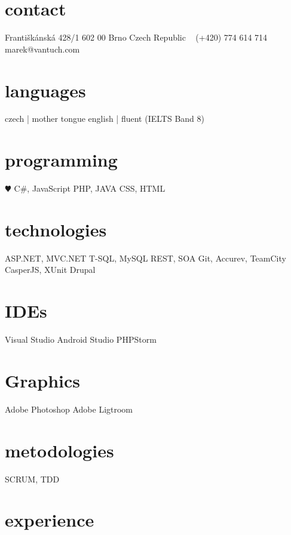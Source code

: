 \documentclass[]{friggeri-cv} %
\begin{document}


\begin{aside} %
\section{contact}
Františkánská 428/1
602 00 Brno
Czech Republic
~
(+420) 774 614 714
~
marek@vantuch.com
\section{languages}
czech | mother tongue
english | fluent
(IELTS Band 8)
\section{programming}
{\color{red} $\varheartsuit$} C\#, JavaScript
PHP, JAVA
CSS, HTML
\section{technologies}
ASP.NET, MVC.NET
T-SQL, MySQL 
REST, SOA
Git, Accurev, TeamCity
CasperJS, XUnit
Drupal
\section{IDEs}
Visual Studio
Android Studio
PHPStorm
\section{Graphics}
Adobe Photoshop
Adobe Ligtroom
\section{metodologies}
SCRUM, TDD
\end{aside}



\section{experience}
\end{document}
